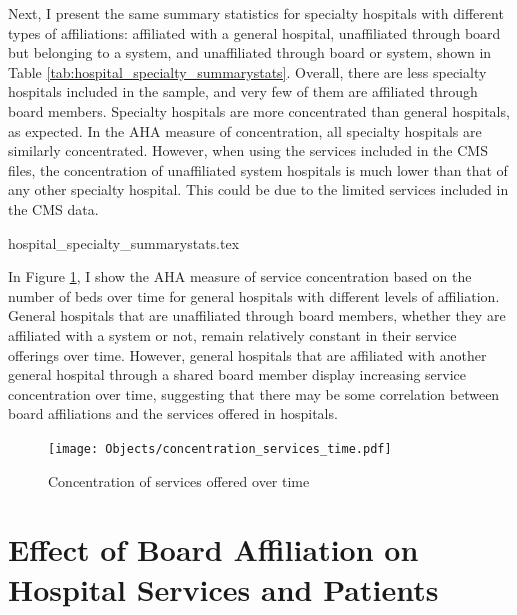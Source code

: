\documentclass[12pt]{article}
\begin{document}
    Next, I present the same summary statistics for specialty hospitals with different types of affiliations: affiliated with a general hospital, unaffiliated through board but belonging to a system, and unaffiliated through board or system, shown in Table \ref{tab:hospital_specialty_summarystats}. Overall, there are less specialty hospitals included in the sample, and very few of them are affiliated through board members. Specialty hospitals are more concentrated than general hospitals, as expected. In the AHA measure of concentration, all specialty hospitals are similarly concentrated. However, when using the services included in the CMS files, the concentration of unaffiliated system hospitals is much lower than that of any other specialty hospital. This could be due to the limited services included in the CMS data. 

    {hospital_specialty_summarystats.tex}

    In Figure \ref{fig:concentration_services_time}, I show the AHA measure of service concentration based on the number of beds over time for general hospitals with different levels of affiliation. General hospitals that are unaffiliated through board members, whether they are affiliated with a system or not, remain relatively constant in their service offerings over time. However, general hospitals that are affiliated with another general hospital through a shared board member display increasing service concentration over time, suggesting that there may be some correlation between board affiliations and the services offered in hospitals.  

    \begin{figure}[ht!]
        \centering
        \caption{Concentration of services offered over time}
        \texttt{[image: Objects/concentration\_services\_time.pdf]}
        \label{fig:concentration_services_time}
    \end{figure}


    \section{Effect of Board Affiliation on Hospital Services and Patients}
\end{document}

